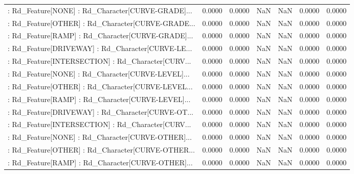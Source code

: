 \begin{longtable}{p{4cm}cccccc}
 : Rd\_Feature[NONE] : Rd\_Character[CURVE-GRADE]... &            0.0000 &            0.0000 &     NaN &          NaN &             0.0000 &            0.0000 \\
 : Rd\_Feature[OTHER] : Rd\_Character[CURVE-GRADE... &            0.0000 &            0.0000 &     NaN &          NaN &             0.0000 &            0.0000 \\
 : Rd\_Feature[RAMP] : Rd\_Character[CURVE-GRADE]... &            0.0000 &            0.0000 &     NaN &          NaN &             0.0000 &            0.0000 \\
 : Rd\_Feature[DRIVEWAY] : Rd\_Character[CURVE-LE... &            0.0000 &            0.0000 &     NaN &          NaN &             0.0000 &            0.0000 \\
 : Rd\_Feature[INTERSECTION] : Rd\_Character[CURV... &            0.0000 &            0.0000 &     NaN &          NaN &             0.0000 &            0.0000 \\
 : Rd\_Feature[NONE] : Rd\_Character[CURVE-LEVEL]... &            0.0000 &            0.0000 &     NaN &          NaN &             0.0000 &            0.0000 \\
 : Rd\_Feature[OTHER] : Rd\_Character[CURVE-LEVEL... &            0.0000 &            0.0000 &     NaN &          NaN &             0.0000 &            0.0000 \\
 : Rd\_Feature[RAMP] : Rd\_Character[CURVE-LEVEL]... &            0.0000 &            0.0000 &     NaN &          NaN &             0.0000 &            0.0000 \\
 : Rd\_Feature[DRIVEWAY] : Rd\_Character[CURVE-OT... &            0.0000 &            0.0000 &     NaN &          NaN &             0.0000 &            0.0000 \\
 : Rd\_Feature[INTERSECTION] : Rd\_Character[CURV... &            0.0000 &            0.0000 &     NaN &          NaN &             0.0000 &            0.0000 \\
 : Rd\_Feature[NONE] : Rd\_Character[CURVE-OTHER]... &            0.0000 &            0.0000 &     NaN &          NaN &             0.0000 &            0.0000 \\
 : Rd\_Feature[OTHER] : Rd\_Character[CURVE-OTHER... &            0.0000 &            0.0000 &     NaN &          NaN &             0.0000 &            0.0000 \\
 : Rd\_Feature[RAMP] : Rd\_Character[CURVE-OTHER]... &            0.0000 &            0.0000 &     NaN &          NaN &             0.0000 &            0.0000 \\

\end{longtable}

